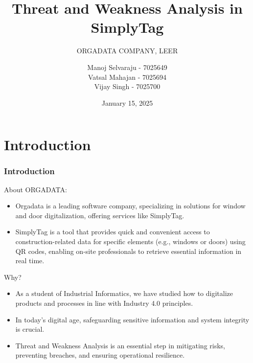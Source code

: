\documentclass[10pt, a4paper]{beamer}
\title{Threat and Weakness Analysis in SimplyTag}
\subtitle{ORGADATA COMPANY, LEER}
\author{
	Manoj Selvaraju - 7025649 \\ 
	Vatsal Mahajan - 7025694\\ 
	Vijay Singh - 7025700
}
\date{January 15, 2025}
\begin{document}
	
	
	
	
	
	\section{Introduction}
	\begin{frame}
		\frametitle{Introduction}
		
		\begin{block}{About ORGADATA:}
			\begin{itemize}
				\item Orgadata is a leading software company, specializing in solutions for window and door digitalization, offering services like SimplyTag.
				\item SimplyTag is a tool that provides quick and convenient access to construction-related data for specific elements (e.g., windows or doors) using QR codes, enabling on-site professionals to retrieve essential information in real time.
			\end{itemize}
		\end{block}
		
		\begin{block}{Why?}
			\begin{itemize}
				\item As a student of Industrial Informatics, we have studied how to digitalize products and processes in line with Industry 4.0 principles.
				\item In today’s digital age, safeguarding sensitive information and system integrity is crucial.
				\item Threat and Weakness Analysis is an essential step in mitigating risks, preventing breaches, and ensuring operational resilience.	
			\end{itemize}
		\end{block}
		
	\end{frame}
	
	
	
\end{document}
